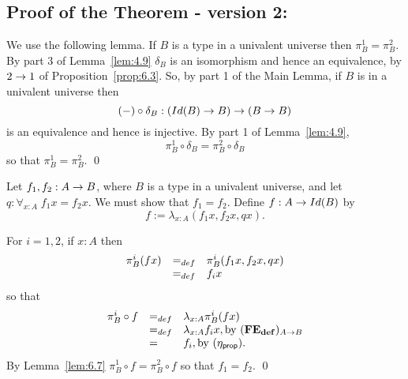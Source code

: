 \subsection{Proof of the Theorem - version 2: } 

We use the following lemma.
\label{fe:lem-projs}\label{lem:6.7}
If $B$ is a type in a univalent universe then $\pi^1_B = \pi^2_B$.
\proof By part 3 of Lemma~\ref{lem:4.9} $\delta_B$ is an isomorphism and hence an equivalence, by $2\ra 1$ of Proposition~\ref{prop:6.3}.  So, by part 1 of the Main Lemma, if $B$ is in a univalent universe then
  \[ (-)\circ\delta_B : (Id(B)\ra B)\ra (B\ra B)\]
is an equivalence and hence is injective.  By part 1 of Lemma~\ref{lem:4.9},
  \[ \pi^1_B\circ\delta_B = \pi^2_B\circ\delta_B\]
so that $\pi^1_B=\pi^2_B$.
\qed


Let $f_1,f_2:A\ra B$, where $B$ is a type in a univalent universe, and let 
$q:\forall_{x:A}\; f_1x=f_2x$.  We must show that $f_1=f_2$.
Define $f:A\ra Id(B)$ by
  \[ f := \lambda_{x:A}(f_1x,f_2x,qx).\]

For $i=1,2$, if $x:A$ then
  \[\be{array}{lll}
\pi^i_B(fx)&=_{def}&\pi^i_B(f_1x,f_2x,qx)\\
           &=_{def}& f_ix
  \en{array}\]
so that
  \[\be{array}{lll}
\pi^i_B\circ f&=_{def}& \lambda_{x:A}\pi^i_B(fx)\\
           &=_{def}& \lambda_{x:A}f_ix,\mbox{by } {\bf (FE_{def}})_{A\ra B}\\
           &=& f_i,\mbox{by }{(\eta_{\sf prop})}.
  \en{array}\]
By Lemma~\ref{lem:6.7} $\pi^1_B\circ f = \pi^2_B\circ f$ so that $f_1=f_2$.
\qed

